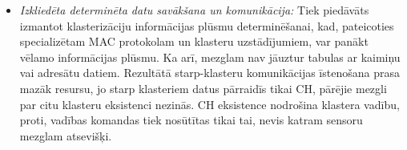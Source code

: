 ﻿\label{sect:Motivation}
\begin{itemize}
\item {\it Izkliedēta determinēta datu savākšana un komunikācija:} Tiek piedāvāts izmantot klasterizāciju informācijas plūsmu determinēšanai, kad, pateicoties specializētam MAC protokolam un klasteru uzstādījumiem, var panākt vēlamo informācijas plūsmu. Ka arī, mezglam nav jāuztur tabulas ar kaimiņu vai adresātu datiem. Rezultātā starp-klasteru komunikācijas īstenošana prasa mazāk resursu, jo starp klasteriem datus pārraidīs tikai CH, pārējie mezgli par citu klasteru eksistenci nezinās. CH eksistence nodrošina klastera vadību, proti, vadības komandas tiek nosūtītas tikai tai, nevis katram sensoru mezglam atsevišķi.


\end{itemize}
